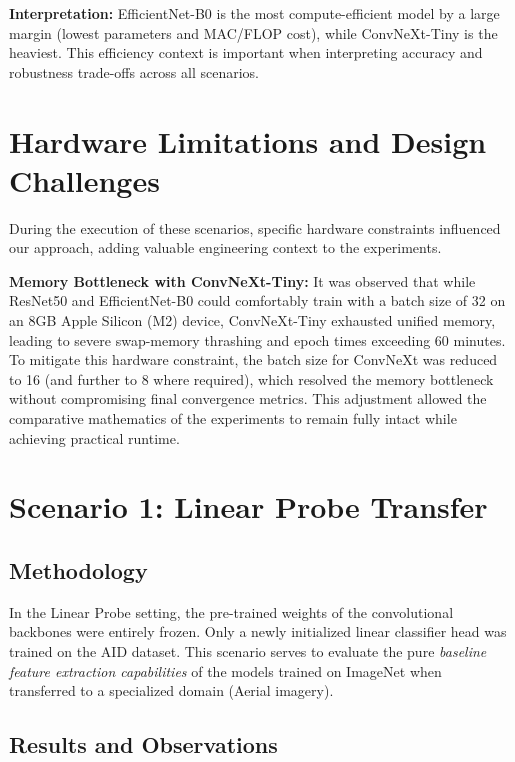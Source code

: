 \documentclass[12pt,a4paper]{article}
\begin{document}
\textbf{Interpretation:}
EfficientNet-B0 is the most compute-efficient model by a large margin (lowest parameters and MAC/FLOP cost), while ConvNeXt-Tiny is the heaviest. This efficiency context is important when interpreting accuracy and robustness trade-offs across all scenarios.


\section{Hardware Limitations and Design Challenges}
\label{sec:challenges}

During the execution of these scenarios, specific hardware constraints influenced our approach, adding valuable engineering context to the experiments. 

\textbf{Memory Bottleneck with ConvNeXt-Tiny:}
It was observed that while ResNet50 and EfficientNet-B0 could comfortably train with a batch size of 32 on an 8GB Apple Silicon (M2) device, ConvNeXt-Tiny exhausted unified memory, leading to severe swap-memory thrashing and epoch times exceeding 60 minutes. To mitigate this hardware constraint, the batch size for ConvNeXt was reduced to 16 (and further to 8 where required), which resolved the memory bottleneck without compromising final convergence metrics. This adjustment allowed the comparative mathematics of the experiments to remain fully intact while achieving practical runtime.


\section{Scenario 1: Linear Probe Transfer}
\label{sec:scenario1}

\subsection{Methodology}
In the Linear Probe setting, the pre-trained weights of the convolutional backbones were entirely frozen. Only a newly initialized linear classifier head was trained on the AID dataset. This scenario serves to evaluate the pure \textit{baseline feature extraction capabilities} of the models trained on ImageNet when transferred to a specialized domain (Aerial imagery).

\subsection{Results and Observations}
\end{document}
